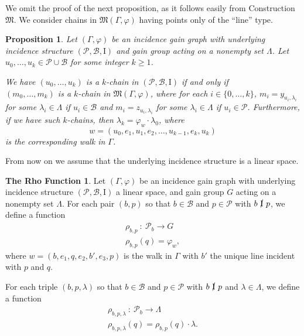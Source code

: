 \documentclass[11pt]{article}
\newtheorem{proposition}[theorem]{Proposition}
\theoremstyle{definition}
\newtheorem*{theorem*}{The Rho Function}
\begin{document}
We omit the proof of the next proposition, as it follows easily from Construction $\mathfrak{M}$.  We consider chains in $\mathfrak{M}(\Gamma,\varphi)$ having points only of the ``line'' type.

\begin{proposition}
Let $(\Gamma,\varphi)$ be an incidence gain graph with underlying incidence structure $(\mathscr{P},\mathscr{B},\mathrm{I})$ and gain group acting on a nonempty set $\Lambda$.  Let $u_0,\dots,u_k \in \mathscr{P} \cup \mathscr{B}$ for some integer $k \geq 1$.

We have $(u_0,\dots,u_k)$ is a $k$-chain in $(\mathscr{P},\mathscr{B},\mathrm{I})$ if and only if \\ $(m_0,\dots,m_k)$ is a $k$-chain in $\mathfrak{M}(\Gamma,\varphi)$, where for each $i \in \{ 0,\dots,k \}$, $m_i = y_{u_i,\lambda_i}$ for some $\lambda_i \in \Lambda$ if $u_i \in \mathscr{B}$ and $m_i = z_{u_i,\lambda_i}$ for some $\lambda_i \in \Lambda$ if $u_i \in \mathscr{P}$.  Furthermore, if we have such $k$-chains, then $\lambda_k = \varphi_{w} \cdot \lambda_0$, where $$w = (u_0,e_1,u_1,e_2,\dots,u_{k-1},e_{k},u_{k})$$ is the corresponding walk in $\Gamma$.
\end{proposition}

From now on we assume that the underlying incidence structure is a linear space.

\begin{theorem*}
Let $(\Gamma,\varphi)$ be an incidence gain graph with underlying incidence structure $(\mathscr{P},\mathscr{B},\mathrm{I})$ a linear space, and gain group $G$ acting on a nonempty set $\Lambda$.  For each pair $(b,p)$ so that $b \in \mathscr{B}$ and $p \in \mathscr{P}$ with $b \ \cancel{\mathrm{I}} \ p$, we define a function
\begin{gather*}
\rho_{b,p} \  : \  \mathscr{P}_b \rightarrow G \\
\rho_{b,p}(q) = \varphi_w,
\end{gather*}
where $w = (b,e_1,q,e_2,b',e_3,p)$ is the walk in $\Gamma$ with $b'$ the unique line incident with $p$ and $q$.

For each triple $(b,p,\lambda)$ so that $b \in \mathscr{B}$ and $p \in \mathscr{P}$ with $b \ \cancel{\mathrm{I}} \ p$ and $\lambda \in \Lambda$, we define a function
\begin{gather*}
\rho_{b,p,\lambda} \  : \  \mathscr{P}_b \rightarrow \Lambda \\
\rho_{b,p,\lambda}(q) = \rho_{b,p}(q) \cdot \lambda.
\end{gather*}
\end{theorem*}
\end{document}
